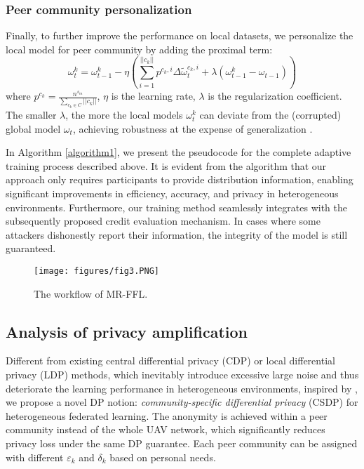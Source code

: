 \documentclass[lettersize,journal]{IEEEtran}
\begin{document}
\subsubsection{Peer community personalization} Finally, to further improve the performance on local datasets, we personalize the local model for peer community by adding the proximal term:
\begin{equation}\label{eq:personal}
\omega_{t}^{k} = \omega_{t-1}^{k} - \eta\left(\sum_{i=1}^{\vert\vert c_{k}\vert\vert}p^{c_{k},i}  \Delta \widetilde{\omega}_{t}^{c_{k},i} + \lambda \left(\omega_{t-1}^{k}-\omega_{t-1} \right)\right)
\end{equation}
    where $p^{c_k}= \frac{n^{s_m}}{\sum_{c_k \in C} \vert\vert c_k\vert\vert}$, $\eta$ is the learning rate, $\lambda$ is the regularization coefficient. The smaller $\lambda$, the more the local models $\omega_t^{k}$ can deviate from the (corrupted) global model $\omega_t$, achieving robustness at the expense of generalization \cite{li2021ditto}.

In Algorithm \ref{algorithm1}, we present the pseudocode for the complete adaptive training process described above. It is evident from the algorithm that our approach only requires participants to provide distribution information, enabling significant improvements in efficiency, accuracy, and privacy in heterogeneous environments. Furthermore, our training method seamlessly integrates with the subsequently proposed credit evaluation mechanism. In cases where some attackers dishonestly report their information, the integrity of the model is still guaranteed.

\begin{figure}[!t]
\centering
\texttt{[image: figures/fig3.PNG]}
\caption{The workflow of MR-FFL.}
\label{fig3:workflow}
\end{figure}


\subsection{Analysis of privacy amplification}


Different from existing central differential privacy (CDP) or local differential privacy (LDP) methods, which inevitably introduce excessive large noise and thus deteriorate the learning performance in heterogeneous environments, inspired by \cite{liu2022privacy}, we propose a novel DP notion: \textit{community-specific differential privacy} (CSDP) for heterogeneous federated learning. The anonymity is achieved within a peer community instead of the whole UAV network, which significantly reduces privacy loss under the same DP guarantee. Each peer community can be assigned with different $\varepsilon_k$ and $\delta_k$ based on personal needs.
\end{document}
